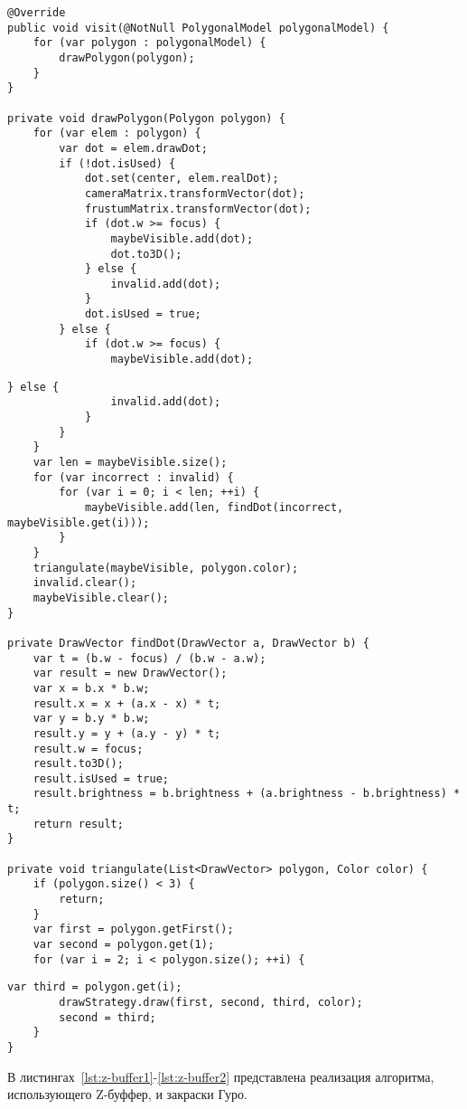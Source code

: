 \begin{lstlisting}[label=lst:cut1,caption=Реализация алгоритма подготовки полигонов к отрисовке (часть~1)]
@Override
public void visit(@NotNull PolygonalModel polygonalModel) {
	for (var polygon : polygonalModel) {
		drawPolygon(polygon);
	}
}

private void drawPolygon(Polygon polygon) {
	for (var elem : polygon) {
		var dot = elem.drawDot;
		if (!dot.isUsed) {
			dot.set(center, elem.realDot);
			cameraMatrix.transformVector(dot);
			frustumMatrix.transformVector(dot);
			if (dot.w >= focus) {
				maybeVisible.add(dot);
				dot.to3D();
			} else {
				invalid.add(dot);
			}
			dot.isUsed = true;
		} else {
			if (dot.w >= focus) {
				maybeVisible.add(dot);
\end{lstlisting}
\begin{lstlisting}[label=lst:cut2,caption=Реализация алгоритма подготовки полигонов к отрисовке (часть~2)]
			} else {
				invalid.add(dot);
			}
		}
	}
	var len = maybeVisible.size();
	for (var incorrect : invalid) {
		for (var i = 0; i < len; ++i) {
			maybeVisible.add(len, findDot(incorrect, maybeVisible.get(i)));
		}
	}
	triangulate(maybeVisible, polygon.color);
	invalid.clear();
	maybeVisible.clear();
}

private DrawVector findDot(DrawVector a, DrawVector b) {
	var t = (b.w - focus) / (b.w - a.w);
	var result = new DrawVector();
	var x = b.x * b.w;
	result.x = x + (a.x - x) * t;
	var y = b.y * b.w;
	result.y = y + (a.y - y) * t;
	result.w = focus;
	result.to3D();
	result.isUsed = true;
	result.brightness = b.brightness + (a.brightness - b.brightness) * t;
	return result;
}

private void triangulate(List<DrawVector> polygon, Color color) {
	if (polygon.size() < 3) {
		return;
	}
	var first = polygon.getFirst();
	var second = polygon.get(1);
	for (var i = 2; i < polygon.size(); ++i) {
\end{lstlisting}
\begin{lstlisting}[label=lst:cut3,caption=Реализация алгоритма подготовки полигонов к отрисовке (часть~3)]
		var third = polygon.get(i);
		drawStrategy.draw(first, second, third, color);
		second = third;
	}
}
\end{lstlisting}

В листингах~\ref{lst:z-buffer1}-\ref{lst:z-buffer2} представлена реализация алгоритма, использующего Z-буффер, и закраски Гуро.

